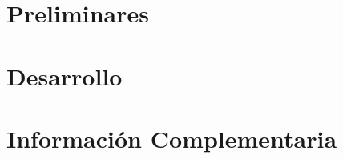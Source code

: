\documentclass[a4paper,oneside,12pt]{book}
\begin{document}
\pagestyle{empty}\thispagestyle{empty}
\maketitle             %

\frontmatter
%
%
\tableofcontents
\listoffigures
\listoftables
%
\mainmatter%

\part{Preliminares}



\part{Desarrollo}





\part{Información Complementaria}


\appendix









\end{document}
